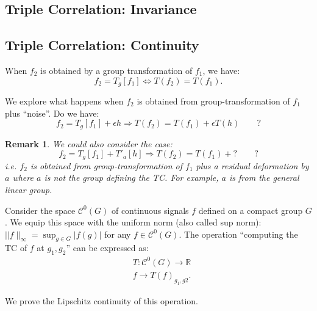 \documentclass{article}
\newtheorem{remark}{Remark}
\begin{document}
\subsection{Triple Correlation: Invariance}

\subsection{Triple Correlation: Continuity}

When $f_2$ is obtained by a group transformation of $f_1$, we have:
\begin{equation}
    f_2 = T_g[f_1] \Leftrightarrow T(f_2) = T(f_1).
\end{equation}

We explore what happens when $f_2$ is obtained from group-transformation of $f_1$ plus ``noise''. Do we have:
\begin{equation}
    f_2 = T_g[f_1] + \epsilon h \Rightarrow T(f_2) = T(f_1) + \epsilon T(h) \qquad?
\end{equation}


\begin{remark}
    We could also consider the case:
\begin{equation}
    f_2 = T_g[f_1] + T'_a[h] \Rightarrow T(f_2) = T(f_1) + ? \qquad?
\end{equation}
i.e. $f_2$ is obtained from group-transformation of $f_1$ plus a residual deformation by $a$ where $a$ is not the group defining the TC. For example, $a$ is from the general linear group.
\end{remark}

Consider the space $\mathcal{C}^0(G)$ of continuous signals $f$ defined on a compact group $G$. We equip this space with the uniform norm (also called sup norm): $|| f \|_{\infty}=\sup _{g \in G}|f(g)|$ for any $f \in \mathcal{C}^0(G)$. The operation ``computing the TC of $f$ at $g_1, g_2$'' can be expressed as:
$$
\begin{aligned}
& T: \mathcal{C}^0(G) \rightarrow \mathbb{R} \\
& f \rightarrow T(f)_{g_1, g2}.
\end{aligned}
$$

We prove the Lipschitz continuity of this operation.
\end{document}
